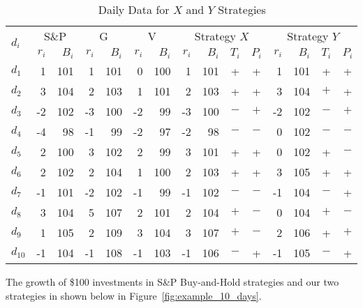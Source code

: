 \documentclass{article}
\begin{document}
\begin{table}[!ht]
    \centering
    \caption{Daily Data for $X$ and $Y$ Strategies}
    \vspace{0.1in}
    \begin{tabular}{l | rr | rr | rr | rrcc | rrcc} \hline
 \multirow{2}{*}{$d_{i}$}    & \multicolumn{2}{c|}{S{\&}P} & \multicolumn{2}{c|}{G} & \multicolumn{2}{c|}{V} & 
    \multicolumn{4}{c|}{Strategy $X$} & \multicolumn{4}{c}{Strategy $Y$} \\ 
    \cline{2-15}
 & $r_{i}$ & $B_{i}$ & $r_{i}$ & $B_{i}$ & $r_{i}$ & $B_{i}$ & $r_{i}$ & $B_{i}$  & $T_{i}$ & $P_{i}$ & $r_{i}$ & $B_{i}$ & $T_{i}$ & $P_{i}$ \\ \hline
        $d_{1}$ & 1   & 101 & 1  & 101  &  0 & 100  &  1 & 101   & +     & +     &  1   & 101 &  +  & + \\ 
        $d_{2}$ & 3   & 104 & 2  & 103  &  1 & 101  &  2 & 103   & +     & +     & 3    & 104 & $+$ & + \\ 
        $d_{3}$ & -2  & 102 & -3 & 100  & -2 & 99   &  -3 & 100  & $-$   & $+$  & -2   & 102 & $-$ & $+$ \\ 
        $d_{4}$ & -4  & 98  & -1 & 99   & -2 & 97   &  -2 & 98   & $-$   & $-$   & 0    & 102 & $-$ & $-$ \\ 
        $d_{5}$ & 2   & 100 & 3  & 102  &  2 & 99   &  3 & 101    & +     & +    & 0    & 102 & +   & $-$ \\ 
        $d_{6}$ & 2   & 102 & 2  & 104  &  1 & 100   &  2 & 103   & +     & +     & 3    & 105 & +   & + \\ 
        $d_{7}$ & -1  & 101 & -2 & 102  & -1 & 99   & -1 & 102   & $-$   & $-$   & -1   & 104 & $-$ & + \\ 
        $d_{8}$ & 3  & 104  & 5  & 107  &  2 & 101   &  2 & 104   & $+$   & $-$     & 0    & 104 & $+$ & $-$ \\ 
        $d_{9}$ & 1   & 105  & 2  & 109  &  3 & 104  &  3 & 107   & $+$   & $-$   & 2    & 106 & + & $+$ \\ 
        $d_{10}$ & -1 & 104 & -1  & 108  & -1 & 103  &  -1 & 106  & $-$     & +   & -1    & 105 & $-$ & + \\ 
    \hline
\end{tabular}
\label{tab_example_11_days}
\end{table}

The growth of \$100 investments in S{\&}P Buy-and-Hold strategies and our two strategies in shown below
in Figure~\ref{fig:example_10_days}.
\end{document}
